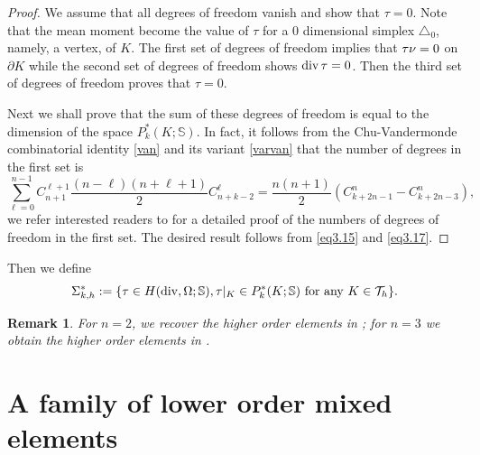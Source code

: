 \documentclass{amsart}
\newtheorem{remark}{Remark}[section]
\numberwithin{table}{section}
\numberwithin{figure}{section}
\begin{document}
\begin{proof} We assume that all degrees of freedom vanish and show that $\tau=0$. Note that the mean moment become the value of $\tau$ for a $0$ dimensional simplex $\triangle_0$, namely, a vertex, of $K$.  The  first set of degrees of freedom implies that $\tau \mathbf{\nu} =0$ on $\partial K$ while the second set of degrees of freedom shows $\operatorname{div} \tau=0$. Then the third set of degrees of freedom  proves that $\tau=0$.


Next we shall
 prove that the sum of these  degrees of freedom is equal to the dimension of the space $P_k^\ast(K; \mathbb{S})$. In fact, it follows from
 the Chu-Vandermonde combinatorial identity \eqref{van} and its variant \eqref{varvan} that the number of degrees in the first
  set is
  \begin{equation}
  \sum\limits_{\ell=0}^{n-1}C_{n+1}^{\ell+1}\frac{(n-\ell)(n+\ell+1)}{2}C_{n+k-2}^\ell=\frac{n(n+1)}{2}(C_{k+2n-1}^n-C_{k+2n-3}^n),
  \end{equation}
    we refer interested readers to \cite[Theorem 2.1]{Hu2014} for a detailed proof of the numbers of degrees of freedom in the first set.
  The desired result follows from \eqref{eq3.15} and \eqref{eq3.17}.
\end{proof}
Then we define
\begin{equation}\label{Shplushorder}
\Sigma_{k,h}^\ast:=\{\tau\in H(\operatorname{div}, \Omega; \mathbb{S}), \tau|_K\in P_k^\ast(K; \mathbb{S}) \text{ for  any }K\in\mathcal{T}_h\}.
\end{equation}

\begin{remark} For $n=2$, we  recover the higher order elements in \cite{Arnold-Winther-conforming}; for $n=3$ we obtain the higher order elements in    \cite{Arnold-Awanou-Winther}.
\end{remark}

\section{A  family of lower order mixed elements}\label{sec3}
\end{document}
